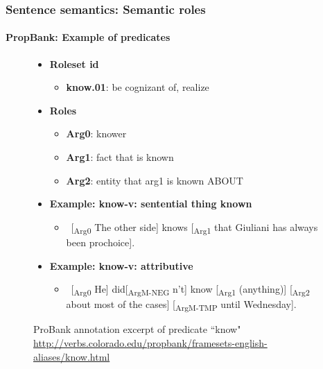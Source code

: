 \documentclass[xcolor=table]{beamer}
\begin{document}
\begin{frame}
\frametitle{Sentence semantics: Semantic roles}
\framesubtitle{PropBank: Example of predicates}
	

\begin{figure}
	\scriptsize
	\begin{tcolorbox}[colback=white, colframe=blue, boxrule=1pt, text width=.91\textwidth]
	\begin{itemize}
		\item \textbf{Roleset id}
		\begin{itemize}\scriptsize
			\item \textbf{know.01}: be cognizant of, realize
		\end{itemize}
		\item \textbf{Roles}
		\begin{itemize}\scriptsize
			\item \textbf{Arg0}: knower
			\item \textbf{Arg1}: fact that is known
			\item \textbf{Arg2}: entity that arg1 is known ABOUT
		\end{itemize}
	
		\item \textbf{Example: know-v: sentential thing known}
		\begin{itemize}\scriptsize
			\item \ [\textsubscript{\color{red}Arg0} The other side] knows [\textsubscript{\color{red}Arg1} that Giuliani has always been prochoice].
		\end{itemize}
	
		\item \textbf{Example: know-v: attributive}
		\begin{itemize}\scriptsize
			\item \ [\textsubscript{\color{red}Arg0} He] did[\textsubscript{\color{red}ArgM-NEG} n't] know [\textsubscript{\color{red}Arg1} (anything)] [\textsubscript{\color{red}Arg2} about most of the cases] [\textsubscript{\color{red}ArgM-TMP} until Wednesday].
		\end{itemize}
	\end{itemize}
	\end{tcolorbox}
		
	\caption{ProBank annotation excerpt of predicate ``know" \url{http://verbs.colorado.edu/propbank/framesets-english-aliases/know.html}}
\end{figure}
	
\end{frame}
\end{document}
